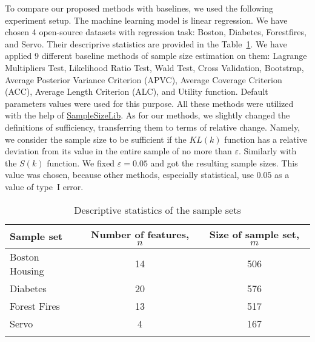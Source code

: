 \documentclass[sn-mathphys-num]{sn-jnl}%
\begin{document}
To compare our proposed methods with baselines, we used the following experiment setup. The machine learning model is linear regression. We have chosen 4 open-source datasets with regression task: Boston, Diabetes, Forestfires, and Servo. Their descriprive statistics are provided in the Table~\ref{table:descr}. We have applied 9 different baseline methods of sample size estimation on them: Lagrange Multipliers Test, Likelihood Ratio Test, Wald Test, Cross Validation, Bootstrap, Average Posterior Variance Criterion (APVC), Average Coverage Criterion (ACC), Average Length Criterion (ALC), and Utility function. Default parameters values were used for this purpose. All these methods were utilized with the help of \href{https://github.com/andriygav/SampleSizeLib}{SampleSizeLib}. As for our methods, we slightly changed the definitions of sufficiency, transferring them to terms of relative change. Namely, we consider the sample size to be sufficient if the $KL(k)$ function has a relative deviation from its value in the entire sample of no more than $\varepsilon$. Similarly with the $S(k)$ function. We fixed $\varepsilon=0.05$ and got the resulting sample sizes. This value was chosen, because other methods, especially statistical, use $0.05$ as a value of type~I error.

\begin{table}[ht]
    \centering
    \caption{Descriptive statistics of the sample sets}\label{table:descr}
    \begin{tabular}{lcc}
    \hline
        \toprule
        Sample set & Number of features, $n$ & Size of sample set, $m$ \\ 
        \midrule
        Boston Housing & 14 & 506 \\ 
        Diabetes & 20 & 576 \\ 
        Forest Fires & 13 & 517 \\ 
        Servo & 4 & 167 \\ 
        \botrule
    \end{tabular}
\end{table}
\end{document}
